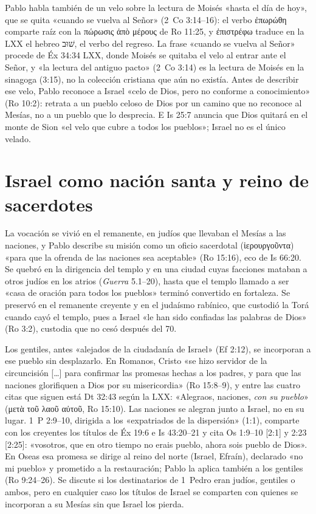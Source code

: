 \documentclass[11pt,letterpaper]{article}
\newcommand{\heb}[1]{\mbox{\foreignlanguage{hebrew}{#1}}}
\newcommand{\grc}[1]{\foreignlanguage{ancientgreek}{#1}}
\begin{document}
Pablo habla también de un velo sobre la lectura de Moisés «hasta el día de hoy», que se quita «cuando se vuelva al Señor» (2~Co 3:14--16): el verbo \grc{ἐπωρώθη} comparte raíz con la \grc{πώρωσις ἀπὸ μέρους} de Ro 11:25, y \grc{ἐπιστρέφω} traduce en la LXX el hebreo \heb{שׁוּב}, el verbo del regreso. La frase «cuando se vuelva al Señor» procede de Éx 34:34 LXX, donde Moisés se quitaba el velo al entrar ante el Señor, y «la lectura del antiguo pacto» (2~Co 3:14) es la lectura de Moisés en la sinagoga (3:15), no la colección cristiana que aún no existía. Antes de describir ese velo, Pablo reconoce a Israel «celo de Dios, pero no conforme a conocimiento» (Ro 10:2): retrata a un pueblo celoso de Dios por un camino que no reconoce al Mesías, no a un pueblo que lo desprecia. E Is 25:7 anuncia que Dios quitará en el monte de Sion «el velo que cubre a todos los pueblos»; Israel no es el único velado.

\section{Israel como nación santa y reino de sacerdotes}

La vocación se vivió en el remanente, en judíos que llevaban el Mesías a las naciones, y Pablo describe su misión como un oficio sacerdotal (\grc{ἱερουργοῦντα}) «para que la ofrenda de las naciones sea aceptable» (Ro 15:16), eco de Is 66:20. Se quebró en la dirigencia del templo y en una ciudad cuyas facciones mataban a otros judíos en los atrios (\emph{Guerra} 5.1--20), hasta que el templo llamado a ser «casa de oración para todos los pueblos» terminó convertido en fortaleza. Se preservó en el remanente creyente y en el judaísmo rabínico, que custodió la Torá cuando cayó el templo, pues a Israel «le han sido confiadas las palabras de Dios» (Ro 3:2), custodia que no cesó después del 70.

Los gentiles, antes «alejados de la ciudadanía de Israel» (Ef 2:12), se incorporan a ese pueblo sin desplazarlo. En Romanos, Cristo «se hizo servidor de la circuncisión [\ldots] para confirmar las promesas hechas a los padres, y para que las naciones glorifiquen a Dios por su misericordia» (Ro 15:8--9), y entre las cuatro citas que siguen está Dt 32:43 según la LXX: «Alegraos, naciones, \emph{con su pueblo}» (\grc{μετὰ τοῦ λαοῦ αὐτοῦ}, Ro 15:10). Las naciones se alegran junto a Israel, no en su lugar. 1~P 2:9--10, dirigida a los «expatriados de la dispersión» (1:1), comparte con los creyentes los títulos de Éx 19:6 e Is 43:20--21 y cita Os 1:9--10 [2:1] y 2:23 [2:25]: «vosotros, que en otro tiempo no erais pueblo, ahora sois pueblo de Dios». En Oseas esa promesa se dirige al reino del norte (Israel, Efraín), declarado «no mi pueblo» y prometido a la restauración; Pablo la aplica también a los gentiles (Ro 9:24--26). Se discute si los destinatarios de 1~Pedro eran judíos, gentiles o ambos, pero en cualquier caso los títulos de Israel se comparten con quienes se incorporan a su Mesías sin que Israel los pierda.
\end{document}
